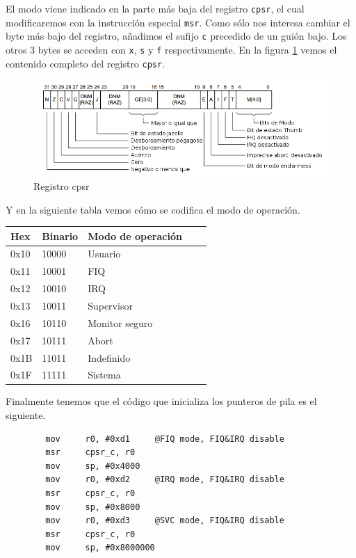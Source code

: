 El modo viene indicado en la parte más baja del registro {\tt cpsr}, el cual modificaremos
con la instrucción especial {\tt msr}. Como sólo nos interesa cambiar el byte más bajo del
registro, añadimos el sufijo {\tt c} precedido de un guión bajo. Los otros 3 bytes se acceden
con {\tt x}, {\tt s} y {\tt f} respectivamente. En la figura \ref{fig:cpsr} vemos el contenido
completo del registro {\tt cpsr}.

\begin{figure}[h]
  \centering
    \includegraphics[width=14cm]{graphs/cpsr.png}
  \caption{Registro cpsr}
  \label{fig:cpsr}
\end{figure}

Y en la siguiente tabla vemos cómo se codifica el modo de operación.

\begin{longtable}{ p{1.8cm} | p{2cm} | p{5cm} | p{1cm} | p{1cm} }
\hline
{\bf Hex} & {\bf Binario} & {\bf Modo de operación} \\ \hline
0x10 & 10000 & Usuario        \\ \hline
0x11 & 10001 & FIQ            \\ \hline
0x12 & 10010 & IRQ            \\ \hline
0x13 & 10011 & Supervisor     \\ \hline
0x16 & 10110 & Monitor seguro \\ \hline
0x17 & 10111 & Abort          \\ \hline
0x1B & 11011 & Indefinido     \\ \hline
0x1F & 11111 & Sistema        \\ \hline
\end{longtable}

Finalmente tenemos que el código que inicializa los punteros de pila es el siguiente.

\begin{lstlisting}
        mov     r0, #0xd1     @FIQ mode, FIQ&IRQ disable
        msr     cpsr_c, r0
        mov     sp, #0x4000
        mov     r0, #0xd2     @IRQ mode, FIQ&IRQ disable
        msr     cpsr_c, r0
        mov     sp, #0x8000
        mov     r0, #0xd3     @SVC mode, FIQ&IRQ disable
        msr     cpsr_c, r0
        mov     sp, #0x8000000
\end{lstlisting}

